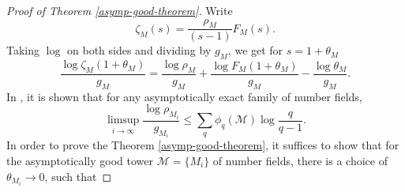 \documentclass[12pt]{amsart}
\theoremstyle{definition}
\newcommand{\rM}{\mathcal{M}}
\begin{document}

\begin{proof}[Proof of Theorem \ref{asymp-good-theorem}]
Write
\begin{equation*}
\zeta_M (s)= \frac{\rho_M}{(s-1)} F_M(s).
\end{equation*}
Taking $\log$ on both sides and dividing by $g_M$, we get for $s = 1+\theta_M$
\begin{equation*}\label{main}
\frac{\log \zeta_M (1+\theta_M)}{g_M} = \frac{\log \rho_M}{g_M} + \frac{\log F_M(1+ \theta_M)}{g_M} - \frac{\log \theta_M}{g_M}.
\end{equation*}
In \cite{TV}, it is shown that for any asymptotically exact family of number fields,
\begin{equation*}
\limsup_{i\to\infty} \frac{\log \rho_{M_i}}{g_{M_i}} \leq \sum_q \phi_q(\rM) \log \frac{q}{q-1}.
\end{equation*}
In order to prove the Theorem \ref{asymp-good-theorem}, it suffices to show that for the asymptotically good tower $\mathcal{M} = \{M_i\}$ of number fields, there is a choice of $\theta_{M_i} \to 0$, such that


\end{proof}
\end{document}
